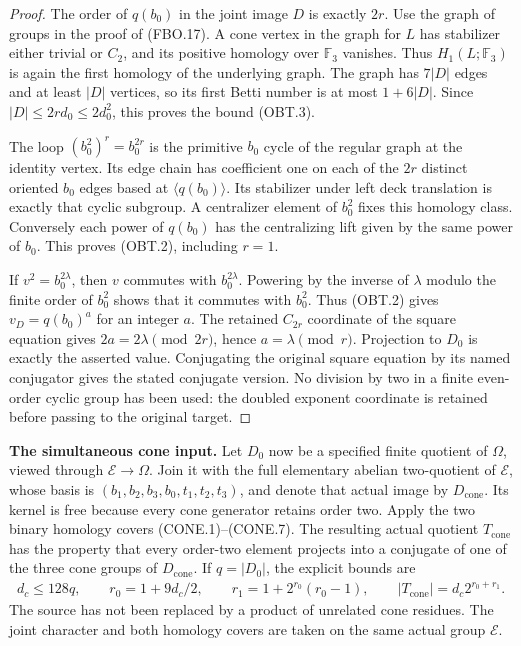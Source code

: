 \begin{proof}
The order of $q(b_0)$ in the joint image $D$ is exactly $2r$.
Use the graph of groups in the proof of (FBO.17).  A cone
vertex in the graph for $L$ has stabilizer either trivial or
$C_2$, and its positive homology over $\mathbb F_3$ vanishes.
Thus $H_1(L;\mathbb F_3)$ is again the first homology of the
underlying graph.  The graph has $7|D|$ edges and at least
$|D|$ vertices, so its first Betti number is at most
$1+6|D|$.  Since $|D|\leq2r d_0\leq2d_0^2$, this proves
the bound (OBT.3).

The loop $(b_0^2)^r=b_0^{2r}$ is the primitive $b_0$ cycle
of the regular graph at the identity vertex.  Its edge chain
has coefficient one on each of the $2r$ distinct oriented
$b_0$ edges based at $\langle q(b_0)\rangle$.
Its stabilizer under left deck translation is exactly that
cyclic subgroup.  A centralizer element of $b_0^2$ fixes
this homology class.  Conversely each power of $q(b_0)$ has
the centralizing lift given by the same power of $b_0$.
This proves (OBT.2), including $r=1$.

If $v^2=b_0^{2\lambda}$, then $v$ commutes with
$b_0^{2\lambda}$.  Powering by the inverse of $\lambda$
modulo the finite order of $b_0^2$ shows that it commutes
with $b_0^2$.  Thus (OBT.2) gives $v_D=q(b_0)^a$ for an
integer $a$.  The retained $C_{2r}$ coordinate of the square
equation gives $2a=2\lambda\pmod {2r}$, hence
$a=\lambda\pmod r$.  Projection to $D_0$ is exactly the
asserted value.  Conjugating the original square equation
by its named conjugator gives the stated conjugate version.
No division by two in a finite even-order cyclic group has
been used: the doubled exponent coordinate is retained
before passing to the original target.
\end{proof}

\par\medskip\noindent\textbf{The simultaneous cone input.}\quad
Let $D_0$ now be a specified finite quotient of $\Omega$,
viewed through $\mathcal E\to\Omega$.
Join it with the full elementary abelian two-quotient of
$\mathcal E$, whose basis is
$(b_1,b_2,b_3,b_0,t_1,t_2,t_3)$, and denote that actual
image by $D_{\mathrm{cone}}$.
Its kernel is free because every cone generator retains
order two.  Apply the two binary homology covers
(CONE.1)--(CONE.7).  The resulting actual quotient
$T_{\mathrm{cone}}$ has the property that every order-two
element projects into a conjugate of one of the three
cone groups of $D_{\mathrm{cone}}$.
If $q=|D_0|$, the explicit bounds are
\[
 \begin{gathered}
 d_c\leq128q,\qquad r_0=1+9d_c/2,\qquad
 r_1=1+2^{r_0}(r_0-1),\qquad
 |T_{\mathrm{cone}}|=d_c2^{r_0+r_1}.
 \end{gathered}                                                   \tag{OBT.4}
\]
The source has not been replaced by a product of unrelated
cone residues.  The joint character and both homology covers
are taken on the same actual group $\mathcal E$.

